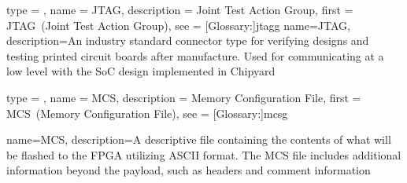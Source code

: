 
{type = \acronymtype,
 name = {JTAG},
 description = {Joint Test Action Group},
 first = {JTAG~(Joint Test Action Group)},
 see = [Glossary:]{jtagg}
 }
{
 name={JTAG},
 description={An industry standard connector type for verifying designs and testing printed circuit boards after manufacture. Used for communicating at a low level with the SoC design implemented in Chipyard}
 }

{
 type = \acronymtype,
 name = {MCS},
 description = {Memory Configuration File},
 first = {MCS~(Memory Configuration File)},
 see = [Glossary:]{mcsg}
}

{
 name={MCS},
 description={A descriptive file containing the contents of what will be flashed to the FPGA utilizing ASCII format. The MCS file includes additional information beyond the payload, such as headers and comment information}}



